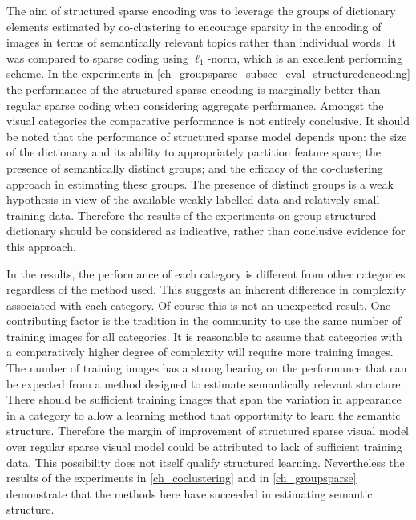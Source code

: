 The aim of structured sparse encoding was to leverage the groups of dictionary elements estimated by co-clustering to encourage sparsity in the encoding of images in terms of semantically relevant topics rather than individual words. It was compared to sparse coding using $\ell_{1}$-norm, which is an excellent performing scheme. In the experiments in \cref{ch_groupsparse_subsec_eval_structuredencoding} the performance of the structured sparse encoding is marginally better than regular sparse coding when considering aggregate performance. Amongst the visual categories the comparative performance is not entirely conclusive. It should be noted that the performance of structured sparse model depends upon: the size of the dictionary and its ability to appropriately partition feature space; the presence of semantically distinct groups; and the efficacy of the co-clustering approach in estimating these groups. The presence of distinct groups is a weak hypothesis in view of the available weakly labelled data and 
relatively small training data. Therefore the results of the experiments on group structured dictionary should be considered as indicative, rather than conclusive evidence for this approach.

In the results, the performance of each category is different from other categories regardless of the method used. This suggests an inherent difference in complexity associated with each category. Of course this is not an unexpected result. One contributing factor is the tradition in the community to use the same number of training images for all categories. It is reasonable to assume that categories with a comparatively higher degree of complexity will require more training images. The number of training images has a strong bearing on the performance that can be expected from a method designed to estimate semantically relevant structure. There should be sufficient training images that span the variation in appearance in a category to allow a learning method that opportunity to learn the semantic structure. Therefore the margin of improvement of structured sparse visual model over regular sparse visual model could be attributed to lack of sufficient training data. This possibility does not itself qualify 
structured learning. Nevertheless the results of the experiments in \cref{ch_coclustering} and in \cref{ch_groupsparse} demonstrate that the methods here have succeeded in estimating semantic structure.
